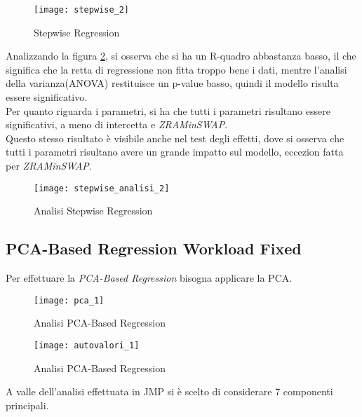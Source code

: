 \begin{figure}[!htbp]
  \centering
  \texttt{[image: stepwise\_2]}
  \caption{Stepwise Regression}
  \label{and_stepwise_2}
\end{figure}
\clearpage
Analizzando la figura \ref{and_stepwise_analisi_2}, si osserva che si ha un R-quadro
abbastanza basso, il che significa che la retta di regressione non fitta troppo
bene i dati, mentre l'analisi della varianza(ANOVA) restituisce un p-value basso,
quindi il modello risulta essere significativo.\\
Per quanto riguarda i parametri, si ha che tutti i parametri risultano essere
significativi, a meno di intercetta e \textit{ZRAMinSWAP}.\\
Questo stesso risultato è visibile anche nel test degli effetti, dove si osserva
che tutti i parametri risultano avere un grande impatto sul modello, eccezion
fatta per \textit{ZRAMinSWAP}.\\
\begin{figure}[!htbp]
  \centering
  \texttt{[image: stepwise\_analisi\_2]}
  \caption{Analisi Stepwise Regression}
  \label{and_stepwise_analisi_2}
\end{figure}

\clearpage

\subsection{PCA-Based Regression Workload Fixed}

Per effettuare la \textit{PCA-Based Regression} bisogna applicare la PCA.\\

\begin{figure}[!htbp]
  \centering
  \texttt{[image: pca\_1]}
  \caption{Analisi PCA-Based Regression}
  \label{and_pca_2}
\end{figure}

\begin{figure}[!htbp]
  \centering
  \texttt{[image: autovalori\_1]}
  \caption{Analisi PCA-Based Regression}
  \label{and_autovalori_2}
\end{figure}

A valle dell'analisi effettuata in JMP si è scelto di considerare 7 componenti
principali.\\

\clearpage


